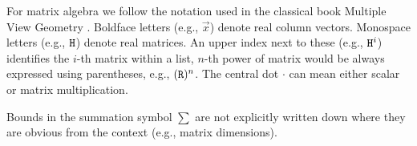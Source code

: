 For matrix algebra we follow the notation used in the classical book Multiple View Geometry \cite{MVG}.
Boldface letters (e.g., $\vec x$) denote real column vectors.
Monospace letters (e.g., $\mathtt{H}$) denote real matrices.
An upper index next to these (e.g., $\mathtt{H}^i$) identifies the $i$-th matrix within a list, $n$-th power of matrix would be always expressed using parentheses, e.g., $(\mathtt{R})^n$.
The central dot $\cdot$ can mean either scalar or matrix multiplication.

Bounds in the summation symbol $\sum$ are not explicitly written down where they are obvious from the context (e.g., matrix dimensions).

